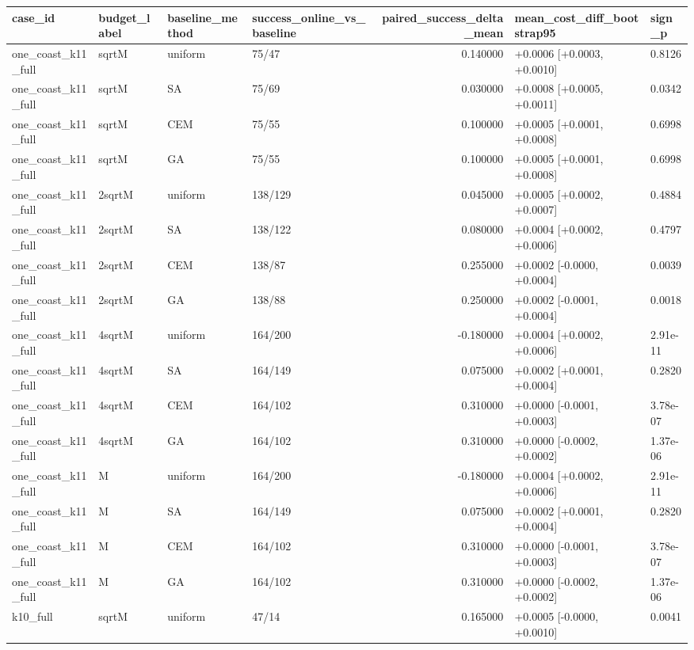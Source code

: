\begin{tabular}{llllrll}
\toprule
case\_id & budget\_label & baseline\_method & success\_online\_vs\_baseline & paired\_success\_delta\_mean & mean\_cost\_diff\_bootstrap95 & sign\_p \\
\midrule
one\_coast\_k11\_full & sqrtM & uniform & 75/47 & 0.140000 & +0.0006 [+0.0003, +0.0010] & 0.8126 \\
one\_coast\_k11\_full & sqrtM & SA & 75/69 & 0.030000 & +0.0008 [+0.0005, +0.0011] & 0.0342 \\
one\_coast\_k11\_full & sqrtM & CEM & 75/55 & 0.100000 & +0.0005 [+0.0001, +0.0008] & 0.6998 \\
one\_coast\_k11\_full & sqrtM & GA & 75/55 & 0.100000 & +0.0005 [+0.0001, +0.0008] & 0.6998 \\
one\_coast\_k11\_full & 2sqrtM & uniform & 138/129 & 0.045000 & +0.0005 [+0.0002, +0.0007] & 0.4884 \\
one\_coast\_k11\_full & 2sqrtM & SA & 138/122 & 0.080000 & +0.0004 [+0.0002, +0.0006] & 0.4797 \\
one\_coast\_k11\_full & 2sqrtM & CEM & 138/87 & 0.255000 & +0.0002 [-0.0000, +0.0004] & 0.0039 \\
one\_coast\_k11\_full & 2sqrtM & GA & 138/88 & 0.250000 & +0.0002 [-0.0001, +0.0004] & 0.0018 \\
one\_coast\_k11\_full & 4sqrtM & uniform & 164/200 & -0.180000 & +0.0004 [+0.0002, +0.0006] & 2.91e-11 \\
one\_coast\_k11\_full & 4sqrtM & SA & 164/149 & 0.075000 & +0.0002 [+0.0001, +0.0004] & 0.2820 \\
one\_coast\_k11\_full & 4sqrtM & CEM & 164/102 & 0.310000 & +0.0000 [-0.0001, +0.0003] & 3.78e-07 \\
one\_coast\_k11\_full & 4sqrtM & GA & 164/102 & 0.310000 & +0.0000 [-0.0002, +0.0002] & 1.37e-06 \\
one\_coast\_k11\_full & M & uniform & 164/200 & -0.180000 & +0.0004 [+0.0002, +0.0006] & 2.91e-11 \\
one\_coast\_k11\_full & M & SA & 164/149 & 0.075000 & +0.0002 [+0.0001, +0.0004] & 0.2820 \\
one\_coast\_k11\_full & M & CEM & 164/102 & 0.310000 & +0.0000 [-0.0001, +0.0003] & 3.78e-07 \\
one\_coast\_k11\_full & M & GA & 164/102 & 0.310000 & +0.0000 [-0.0002, +0.0002] & 1.37e-06 \\
k10\_full & sqrtM & uniform & 47/14 & 0.165000 & +0.0005 [-0.0000, +0.0010] & 0.0041 \\

\end{tabular}
